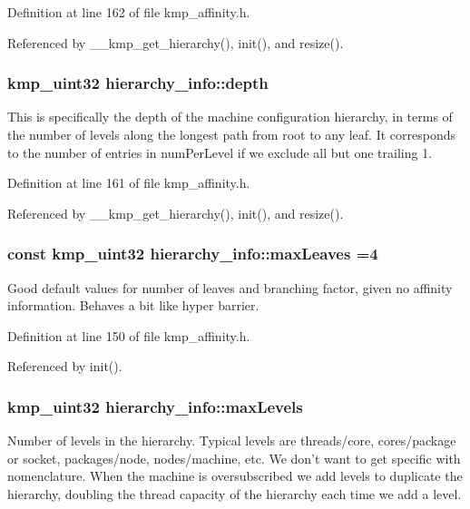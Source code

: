 Definition at line 162 of file kmp\-\_\-affinity.\-h.



Referenced by \-\_\-\-\_\-kmp\-\_\-get\-\_\-hierarchy(), init(), and resize().

\hypertarget{classhierarchy__info_aeebcad75a7d471e1b1fd37aab6216f22}{
\subsubsection[{depth}]{\setlength{\rightskip}{0pt plus 5cm}kmp\-\_\-uint32 hierarchy\-\_\-info\-::depth}}\label{classhierarchy__info_aeebcad75a7d471e1b1fd37aab6216f22}
This is specifically the depth of the machine configuration hierarchy, in terms of the number of levels along the longest path from root to any leaf. It corresponds to the number of entries in num\-Per\-Level if we exclude all but one trailing 1. 

Definition at line 161 of file kmp\-\_\-affinity.\-h.



Referenced by \-\_\-\-\_\-kmp\-\_\-get\-\_\-hierarchy(), init(), and resize().

\hypertarget{classhierarchy__info_a4122e10b5d763f2ca3f13076f836ddfe}{
\subsubsection[{max\-Leaves}]{\setlength{\rightskip}{0pt plus 5cm}const kmp\-\_\-uint32 hierarchy\-\_\-info\-::max\-Leaves =4\hspace{0.3cm}{\ttfamily [static]}}}\label{classhierarchy__info_a4122e10b5d763f2ca3f13076f836ddfe}
Good default values for number of leaves and branching factor, given no affinity information. Behaves a bit like hyper barrier. 

Definition at line 150 of file kmp\-\_\-affinity.\-h.



Referenced by init().

\hypertarget{classhierarchy__info_aafbad4b89a239ea459aaef1ab4908aba}{
\subsubsection[{max\-Levels}]{\setlength{\rightskip}{0pt plus 5cm}kmp\-\_\-uint32 hierarchy\-\_\-info\-::max\-Levels}}\label{classhierarchy__info_aafbad4b89a239ea459aaef1ab4908aba}
Number of levels in the hierarchy. Typical levels are threads/core, cores/package or socket, packages/node, nodes/machine, etc. We don't want to get specific with nomenclature. When the machine is oversubscribed we add levels to duplicate the hierarchy, doubling the thread capacity of the hierarchy each time we add a level. 

